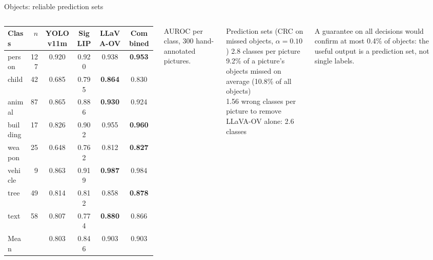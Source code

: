 \documentclass[aspectratio=169,10pt]{beamer}
\begin{document}
\begin{frame}{Objects: reliable prediction sets}
\begin{columns}[T,onlytextwidth]
\scriptsize\renewcommand{\arraystretch}{1.13}
\begin{tabular}{@{}l r c c c c@{}}
\toprule
Class & $n$ & YOLOv11m & SigLIP & LLaVA-OV & Combined\\
\midrule
person & 127 & 0.920 & 0.920 & 0.938 & \textbf{0.953}\\
child & 42 & 0.685 & 0.795 & \textbf{0.864} & 0.830\\
animal & 87 & 0.865 & 0.886 & \textbf{0.930} & 0.924\\
building & 17 & 0.826 & 0.902 & 0.955 & \textbf{0.960}\\
weapon & 25 & 0.648 & 0.762 & 0.812 & \textbf{0.827}\\
vehicle & 9 & 0.863 & 0.919 & \textbf{0.987} & 0.984\\
tree & 49 & 0.814 & 0.812 & 0.858 & \textbf{0.878}\\
text & 58 & 0.807 & 0.774 & \textbf{0.880} & 0.866\\
\midrule
Mean & & 0.803 & 0.846 & 0.903 & 0.903\\
\bottomrule
\end{tabular}\par
{\scriptsize\color{muted}AUROC per class, 300 hand-annotated pictures.}
\begin{defbox}{Prediction sets (CRC on missed objects, $\alpha = 0.10$)}
2.8 classes per picture\\
9.2\% of a picture's objects missed on average (10.8\% of all objects)\\
1.56 wrong classes per picture to remove\\
LLaVA-OV alone: 2.6 classes
\end{defbox}\vspace{3pt}
\begin{keybox}[fontupper=\scriptsize\raggedright]
A guarantee on all decisions would confirm at most 0.4\% of objects: the useful output is a prediction set, not single labels.
\end{keybox}
\end{columns}
\end{frame}
\end{document}
